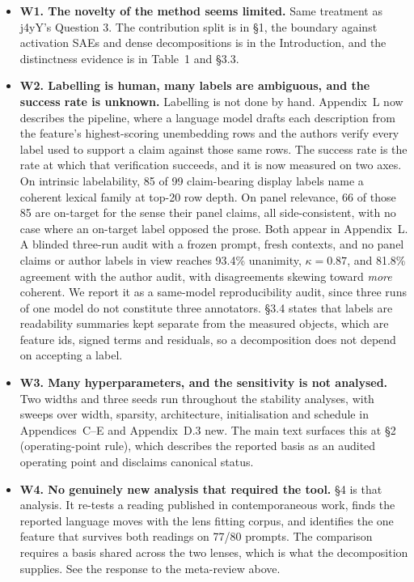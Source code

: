 \documentclass[11pt]{article}
\begin{document}
\begin{itemize}
\item \textbf{W1. The novelty of the method seems limited.} Same treatment as
j4yY's Question 3. The contribution split is in \S1, the boundary against
activation SAEs and dense decompositions is in the Introduction,
and the distinctness evidence is in Table~1 and \S3.3.

\item \textbf{W2. Labelling is human, many labels are ambiguous, and the
success rate is unknown.} Labelling is not done by hand. Appendix~L now
describes the pipeline, where a language model drafts each description from
the feature's highest-scoring unembedding rows and the authors verify every
label used to support a claim against those same rows. The success rate is
the rate at which that verification succeeds, and it is now measured on two
axes. On intrinsic labelability, 85 of 99
claim-bearing display labels name a coherent lexical family at top-20 row
depth. On panel relevance, 66 of those 85 are on-target for the sense their
panel claims, all side-consistent, with no case where an on-target label
opposed the prose. Both appear in Appendix~L. A blinded
three-run audit with a frozen prompt, fresh contexts, and no panel claims or
author labels in view reaches 93.4\% unanimity, $\kappa=0.87$, and 81.8\%
agreement with the author audit, with disagreements skewing toward
\emph{more} coherent. We report it as a same-model reproducibility audit,
since three runs of one model do not constitute three annotators. \S3.4 states that labels are readability summaries kept separate from
the measured objects, which are feature ids, signed terms and residuals, so a
decomposition does not depend on accepting a label.

\item \textbf{W3. Many hyperparameters, and the sensitivity is not analysed.}
Two widths and three seeds run throughout the stability analyses, with sweeps
over width, sparsity, architecture, initialisation and schedule in
Appendices~C--E and Appendix~D.3 new. The main text surfaces this at \S2
(operating-point rule), which describes the reported basis as an
audited operating point and disclaims canonical status.

\item \textbf{W4. No genuinely new analysis that required the tool.} \S4 is
that analysis. It re-tests a reading published in contemporaneous work, finds
the reported language moves with the lens fitting corpus, and identifies the
one feature that survives both readings on 77/80 prompts. The comparison
requires a basis shared across the two lenses, which is what the
decomposition supplies. See the response to the meta-review above.
\end{itemize}
\end{document}
